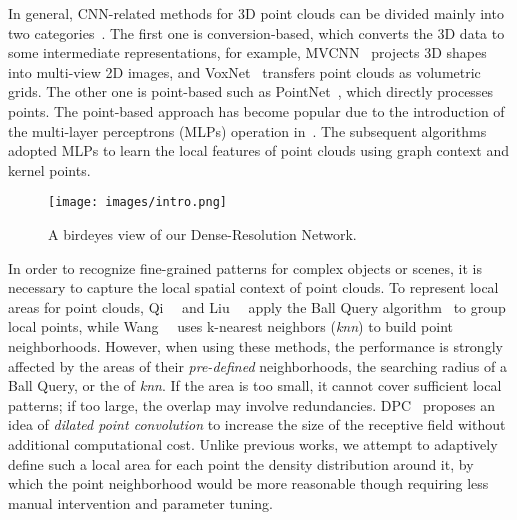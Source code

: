 \documentclass[10pt,twocolumn,letterpaper]{article}
\begin{document}
In general, CNN-related methods for 3D point clouds can be divided mainly into two categories~\cite{guo2020deep}. The first one is conversion-based, which converts the 3D data to some intermediate representations, for example, MVCNN~\cite{su2015multi} projects 3D shapes into multi-view 2D images, and VoxNet~\cite{maturana2015voxnet} transfers point clouds as volumetric grids. The other one is point-based such as PointNet~\cite{qi2017pointnet}, which directly processes points. The point-based approach has become popular due to the introduction of the multi-layer perceptrons (MLPs) operation in~\cite{qi2017pointnet}. The subsequent algorithms~\cite{wang2019dynamic, Thomas_2019_ICCV} adopted MLPs to learn the local features of point clouds using graph context and kernel points.
\begin{figure}
\begin{center}
\texttt{[image: images/intro.png]}
\end{center}
\caption{A birdeyes view of our Dense-Resolution Network.}
\label{fig:intro}
\end{figure}

In order to recognize fine-grained patterns for complex objects or scenes, it is necessary to capture the local spatial context of point clouds. To represent local areas for point clouds, Qi~\etal~\cite{qi2017pointnet++} and Liu~\etal~\cite{liu2019relation} apply the Ball Query algorithm~\cite{omohundro1989five} to group local points, while Wang~\etal~\cite{wang2019dynamic} uses k-nearest neighbors (\emph{knn}) to build point neighborhoods. However, when using these methods, the performance is strongly affected by the areas of their \emph{pre-defined} neighborhoods, \ie the searching radius of a Ball Query, or the  of \emph{knn}. If the area is too small, it cannot cover sufficient local patterns; if too large, the overlap may involve redundancies. DPC~\cite{engelmann2019dilated} proposes an idea of \emph{dilated point convolution} to increase the size of the receptive field without additional computational cost. Unlike previous works, we attempt to adaptively define such a local area for each point \wrt the density distribution around it, by which the point neighborhood would be more reasonable though requiring less manual intervention and parameter tuning.
\end{document}

